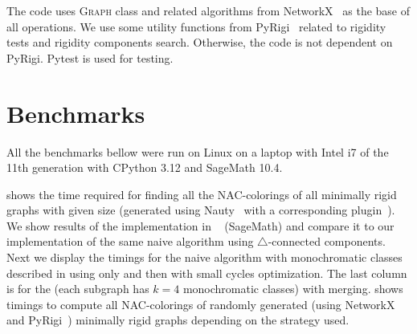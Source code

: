 The code uses \textsc{Graph} class and related algorithms from NetworkX~\cite{networkx}
as the base of all operations. We use some utility functions from PyRigi~\cite{pyrigi}
related to rigidity tests and rigidity components search.
Otherwise, the code is not dependent on PyRigi.
Pytest is used for testing.

\section{Benchmarks}


All the benchmarks bellow were run on Linux
on a laptop with Intel i7 of the 11th generation
with CPython 3.12 and SageMath 10.4.

 shows the time required for finding all the NAC-colorings
of all minimally rigid graphs with given size (generated using Nauty~\cite{nauty}
with a corresponding plugin~\cite{nauty_plugin}).
We show results of the implementation in \flexrilog{}~\cite{flexrilog_github} (SageMath)
and compare it to our implementation of the same naive algorithm using $\triangle$-connected components.
Next we display the timings for the naive algorithm with monochromatic classes
described in  using only \IsNACColoring{}
and then with small cycles optimization.
The last column is for the \NeighborsDegree{} (each subgraph has $k=4$ monochromatic classes)
with \MergeLinear{} merging.
 shows timings to compute all NAC-colorings of
randomly generated (using NetworkX~\cite{networkx} and
PyRigi~\cite{pyrigi}) minimally rigid graphs depending on the strategy used.


